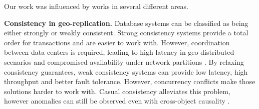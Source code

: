 \documentclass[sigplan,twocolumn,review,anonymous]{acmart}
\begin{document}

Our work was influenced by works in several different areas.

\noindent
\textbf{Consistency in geo-replication.}
Database systems can be classified as being either strongly or weakly consistent.
Strong consistency systems \cite{spanner, slog, scatter, krikellas2010strongly, sconekv, lu2021epoch, hildred2023caerus, nguyen2023detock} provide a total order for transactions and are easier to work with.
However, coordination between data centers is required, leading to high latency in geo-distributed scenarios and compromised availability under network partitions \cite{cap}.
By relaxing consistency guarantees, weak consistency systems \cite{dynamo, couchDB, cassandra, chainreaction, cops, riak, eiger} can provide low latency, high throughput and better fault tolerance.
However, concurrency conflicts make those solutions harder to work with.
Casual consistency 
alleviates this problem, however anomalies can still be observed even with cross-object causality \cite{cops, burckhardt2013understanding, ferreira2023antipode}.
\end{document}
